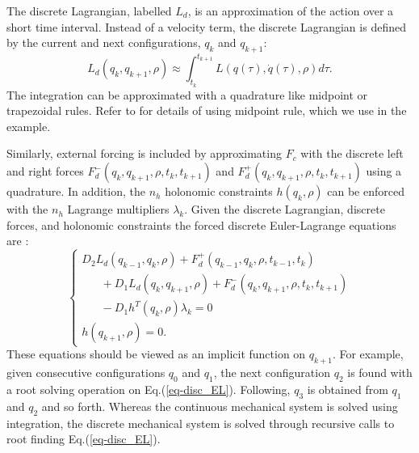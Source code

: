 \documentclass[letterpaper, 10pt, conference]{ieeeconf}
\begin{document}
The discrete Lagrangian, labelled $L_d$, is an approximation of the action over a short time interval.  Instead of a velocity term, the discrete Lagrangian is defined by the current and next configurations, $q_k$ and $q_{k+1}$:
\begin{equation}
L_d(q_k,q_{k+1},\rho) \approx \int_{t_k}^{t_{k+1}}L(q(\tau),\dot{q}(\tau),\rho)d\tau.
\label{eq-Ld}
\end{equation}
The integration can be approximated with a quadrature like midpoint or trapezoidal rules.  Refer to \cite{johnson_murphey_scalable} for details of using midpoint rule, which we use in the example.  

Similarly, external forcing is included by approximating $F_c$ with the discrete left and right forces $F_d^-(q_k,q_{k+1},\rho,t_k,t_{k+1})$ and $F_d^+(q_k,q_{k+1},\rho,t_k,t_{k+1})$ using a quadrature.  In addition, the $n_h$ holonomic constraints $h(q_k,\rho)$ can be enforced with the $n_h$ Lagrange multipliers $\lambda_k$.  Given the discrete Lagrangian, discrete forces, and holonomic constraints the forced discrete Euler-Lagrange equations are \cite{johnson_murphey_scalable}:
\begin{equation}
\left\{\begin{array}{l}
D_2 L_d(q_{k-1},q_{k},\rho) + F_d^+(q_{k-1},q_{k},\rho,t_{k-1},t_{k}) \\\hspace{20pt}+ D_1L_d(q_k,q_{k+1},\rho) + F_d^-(q_k,q_{k+1},\rho,t_k,t_{k+1}) \\\hspace{20pt} - D_1h^T(q_k,\rho)\lambda_k= 0 \\
\hspace{0pt}h(q_{k+1},\rho) = 0.
\end{array}
\right.
\label{eq-disc_EL}
\end{equation}
These equations should be viewed as an implicit function on $q_{k+1}$.  For example, given consecutive configurations $q_0$ and $q_1$, the next configuration $q_2$ is found with a root solving operation on Eq.(\ref{eq-disc_EL}). Following, $q_3$ is obtained from $q_1$ and $q_2$ and so forth.  Whereas the continuous mechanical system is solved using integration, the discrete mechanical system is solved through recursive calls to root finding Eq.(\ref{eq-disc_EL}). 
\end{document}
